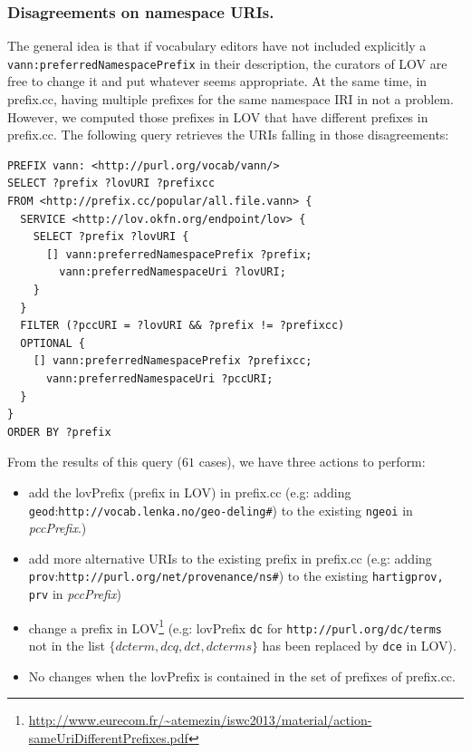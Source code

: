 \begin{description}
\subsubsection*{Disagreements on namespace URIs.} The general idea is that if vocabulary editors have not included explicitly a \\ \texttt{vann:preferredNamespacePrefix} in their description, the curators of LOV are free to change it and put whatever seems appropriate. At the same time, in prefix.cc, having multiple prefixes for the same namespace IRI in not a problem. However, we computed those prefixes in LOV that have different prefixes in prefix.cc. The following query retrieves the URIs falling in those disagreements:
\begin{verbatim}
PREFIX vann: <http://purl.org/vocab/vann/>
SELECT ?prefix ?lovURI ?prefixcc
FROM <http://prefix.cc/popular/all.file.vann> {
  SERVICE <http://lov.okfn.org/endpoint/lov> {
    SELECT ?prefix ?lovURI {
      [] vann:preferredNamespacePrefix ?prefix;
        vann:preferredNamespaceUri ?lovURI;
    }
  }
  FILTER (?pccURI = ?lovURI && ?prefix != ?prefixcc)
  OPTIONAL {
    [] vann:preferredNamespacePrefix ?prefixcc;
      vann:preferredNamespaceUri ?pccURI;
  }
}
ORDER BY ?prefix
\end{verbatim}
From the results of this query ($61$ cases), we have three actions to perform:
\begin{itemize}
  \item add the lovPrefix (prefix in LOV) in prefix.cc (e.g: adding \\\texttt{geod}:\texttt{http://vocab.lenka.no/geo-deling\#}) to the existing \texttt{ngeoi} in \textit{pccPrefix}.)
  \item add more alternative URIs to the existing prefix in prefix.cc (e.g: adding \texttt{prov}:\texttt{http://purl.org/net/provenance/ns\#}) to the existing \texttt{hartigprov, prv} in \textit{pccPrefix})
  \item change a prefix in LOV\footnote{\url{http://www.eurecom.fr/~atemezin/iswc2013/material/action-sameUriDifferentPrefixes.pdf}} (e.g: lovPrefix \texttt{dc} for \texttt{http://purl.org/dc/terms} not in the list $\{dcterm, dcq, dct, dcterms\}$ has been replaced by \texttt{dce} in LOV).
  \item No changes when the lovPrefix is contained in the set of prefixes of prefix.cc.
\end{itemize}


\end{description}
